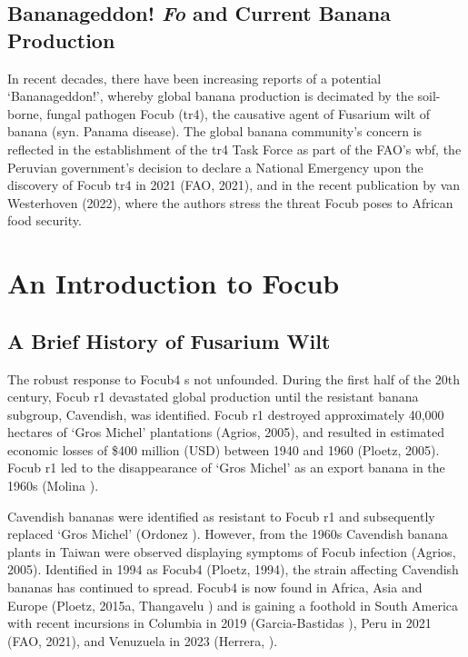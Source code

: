 \subsection{Bananageddon! \textit{\acl{Fo}} and Current Banana Production}

In recent decades, there have been increasing reports of a potential ‘Bananageddon!’, whereby global banana production is decimated by the soil-borne, fungal pathogen \acl{Focub} (\ac{tr4}), the causative agent of Fusarium wilt of banana (syn. Panama disease). The global banana community’s concern is reflected in the establishment of the \ac{tr4} Task Force as part of the \ac{FAO}'s \ac{wbf}, the Peruvian government’s decision to declare a National Emergency upon the discovery of \ac{Focub} \ac{tr4} in 2021 (FAO, 2021), and in the recent publication by van Westerhoven \et (2022), where the authors stress the threat \ac{Focub} poses to African food security.   

\section{An Introduction to \acl{Focub}}

\subsection{A Brief History of Fusarium Wilt}

The robust response to \ac{Focub4} s not unfounded. During the first half of the 20th century, \ac{Focub} \ac{r1} devastated global production until the resistant banana subgroup, Cavendish, was identified. \ac{Focub} \ac{r1} destroyed approximately 40,000 hectares of ‘Gros Michel’ plantations (Agrios, 2005), and resulted in estimated economic losses of \$400 million (USD) between 1940 and 1960 (Ploetz, 2005). \ac{Focub} \ac{r1} led to the disappearance of ‘Gros Michel’ as an export banana in the 1960s (Molina ).  

Cavendish bananas were identified as resistant to \ac{Focub} \ac{r1} and subsequently replaced ‘Gros Michel’ (Ordonez ). However, from the 1960s Cavendish banana plants in Taiwan were observed displaying symptoms of \ac{Focub} infection (Agrios, 2005). Identified in 1994 as \acl{Focub4} (Ploetz, 1994), the strain affecting Cavendish bananas has continued to spread. \ac{Focub4} is now found in Africa, Asia and Europe (Ploetz, 2015a, Thangavelu ) and is gaining a foothold in South America with recent incursions in Columbia in 2019 (Garcia-Bastidas ), Peru in 2021 (\ac{FAO}, 2021), and Venuzuela in 2023 (Herrera, ).

